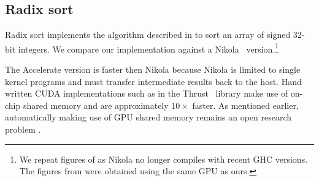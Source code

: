 \subsection{Radix sort}
Radix sort implements the algorithm described in \citet{Blelloch:1990vl} to sort an array of signed 32-bit integers. We compare our implementation against a Nikola~\cite{Mainland:nikola} version.\footnote{We repeat figures of \cite{Mainland:nikola} as Nikola no longer compiles with recent GHC versions. The figures from \cite{Mainland:nikola} were obtained using the same GPU as ours.}


The Accelerate version is faster then Nikola because Nikola is limited to single kernel programs and must transfer intermediate results back to the host. Hand written CUDA implementations such as in the Thrust~\cite{Satish:2009kx} library make use of on-chip shared memory and are approximately $10\times$ faster. As mentioned earlier, automatically making use of GPU shared memory remains an open research problem \cite{Ma:ifp-shared-memory}.





